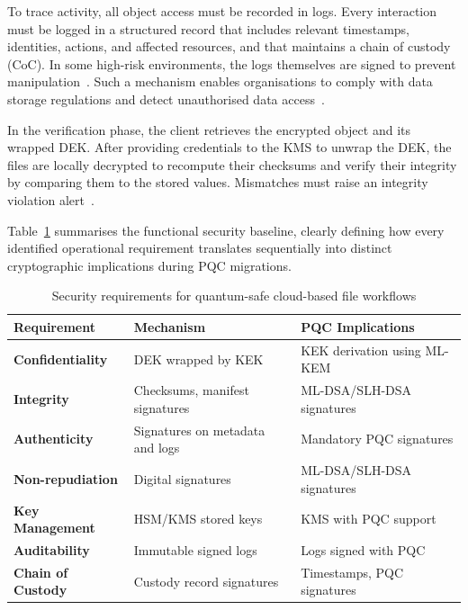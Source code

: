 \documentclass[12pt,a4paper]{article}
\begin{document}
To trace activity, all object access must be recorded in logs. Every interaction must be logged in a structured record that includes relevant timestamps, identities, actions, and affected resources, and that maintains a chain of custody (CoC). In some high-risk environments, the logs themselves are signed to prevent manipulation~\cite{KS06}. Such a mechanism enables organisations to comply with data storage regulations and detect unauthorised data access~\cite {Ama23}.

In the verification phase, the client retrieves the encrypted object and its wrapped DEK. After providing credentials to the KMS to unwrap the DEK, the files are locally decrypted to recompute their checksums and verify their integrity by comparing them to the stored values. Mismatches must raise an integrity violation alert~\cite{Ven+23}. 

Table~\ref{tab:security-requirements} summarises the functional security baseline, clearly defining how every identified operational requirement translates sequentially into distinct cryptographic implications during PQC migrations.

\begin{table}[H]
\centering
\caption{Security requirements for quantum-safe cloud-based file workflows}
\label{tab:security-requirements}
\begin{tabularx}{\textwidth}{@{} >{\raggedright\arraybackslash\bfseries}p{3.5cm} >{\raggedright\arraybackslash}X >{\raggedright\arraybackslash}X @{}}
\toprule
Requirement & Mechanism & PQC Implications \\
\midrule
Confidentiality  & DEK wrapped by KEK                   & KEK derivation using ML-KEM \\[4pt]
Integrity        & Checksums, manifest signatures        & ML-DSA/SLH-DSA signatures \\[4pt]
Authenticity     & Signatures on metadata and logs       & Mandatory PQC signatures \\[4pt]
Non-repudiation  & Digital signatures                    & ML-DSA/SLH-DSA signatures \\[4pt]
Key Management   & HSM/KMS stored keys                   & KMS with PQC support \\[4pt]
Auditability     & Immutable signed logs                 & Logs signed with PQC \\[4pt]
Chain of Custody & Custody record signatures             & Timestamps, PQC signatures \\
\bottomrule
\end{tabularx}
\end{table}
\end{document}
